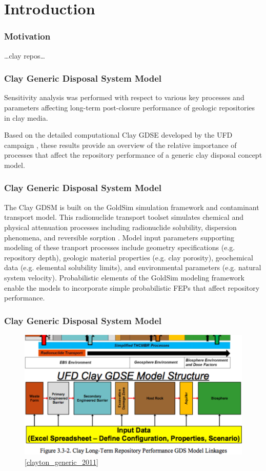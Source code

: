 
\section{Introduction}
\begin{frame}[c]
  \frametitle{Motivation}
  \ldots clay repos\ldots 
\end{frame}

\begin{frame}[c]
  \frametitle{Clay Generic Disposal System Model}
Sensitivity analysis was performed with respect to various key processes and 
parameters affecting long-term post-closure performance of geologic repositories 
in clay media. 

Based on the detailed computational Clay 
\gls{GDSE} developed by the \gls{UFD} campaign \cite{clayton_generic_2011}, 
these results provide an overview of the relative importance of processes 
that affect the repository performance of a generic clay disposal concept model. 
\end{frame}


\begin{frame}[c]
  \frametitle{Clay Generic Disposal System Model}
The Clay \gls{GDSM} is built on the GoldSim simulation framework and contaminant 
transport model.  This radionuclide transport toolset simulates chemical and 
physical attenuation processes including radionuclide solubility, dispersion 
phenomena, and reversible sorption \cite{golder_goldsim_2010, 
golder_goldsim_ct_2010}. Model input parameters supporting modeling of these 
tranport 
processes include geometry specifications (e.g. repository depth), geologic 
material properties (e.g. clay porosity), geochemical data 
(e.g. elemental solubility limits), and environmental parameters (e.g. natural 
system velocity). Probabilistic elements of the GoldSim modeling 
framework enable the models to incorporate simple probabilistic \gls{FEPs} that 
affect repository performance.
\end{frame}

\begin{frame}[c]
  \frametitle{Clay Generic Disposal System Model}
\begin{figure}[htb!]
\begin{center}
\includegraphics[width=\linewidth]{feps.eps}
\end{center}
\caption{\ref{clayton_generic_2011}}
\label{fig:feps}
\end{figure}
\end{frame}

